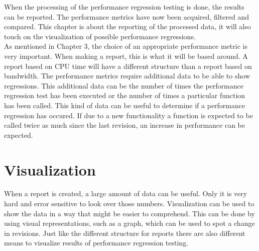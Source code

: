 When the processing of the performance regression testing is done, the results can be reported. The performance metrics have now been acquired, filtered and compared. This chapter is about the reporting of the processed data, it will also touch on the visualization of possible performance regressions. \\

As mentioned in Chapter 3, the choice of an appropriate performance metric is very important. When making a report, this is what it will be based around. A report based on CPU time will have a different structure than a report based on bandwidth. The performance metrics require additional data to be able to show regressions. This additional data can be the number of times the performance regression test has been executed or the number of times a particular function has been called. This kind of data can be useful to determine if a performance regression has occured. If due to a new functionality a function is expected to be called twice as much since the last revision, an increase in performance can be expected.\\

\section{Visualization}
When a report is created, a large amount of data can be useful. Only it is very hard and error sensitive to look over those numbers. Visualization can be used to show the data in a way that might be easier to comprehend. This can be done by using visual representations, such as a graph, which can be used to spot a change in revisions. Just like the different structure for reports there are also different means to visualize results of performance regression testing.\\
